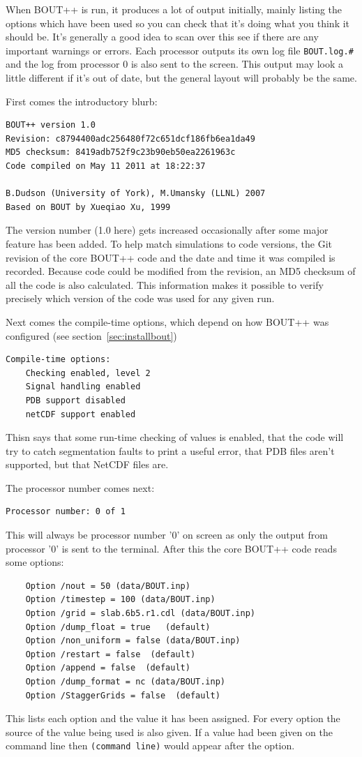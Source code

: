 \documentclass[12pt]{article}
\begin{document}
When BOUT++ is run, it produces a lot of output initially, mainly listing
the options which have been used so you can check that it's doing what you
think it should be. It's generally a good idea to scan over this
see if there are any important warnings or errors. Each processor outputs
its own log file \texttt{BOUT.log.\#}
and the log from processor 0 is also sent to the screen. This output may
look a little different if it's out of date, but the general layout will
probably be the same.

First comes the introductory blurb:
\begin{verbatim}
BOUT++ version 1.0
Revision: c8794400adc256480f72c651dcf186fb6ea1da49
MD5 checksum: 8419adb752f9c23b90eb50ea2261963c
Code compiled on May 11 2011 at 18:22:37

B.Dudson (University of York), M.Umansky (LLNL) 2007
Based on BOUT by Xueqiao Xu, 1999
\end{verbatim}
The version number (1.0 here) gets increased occasionally after
some major feature has been added. To help match simulations to code versions,
the Git revision of the core BOUT++ code and the date and time it was
compiled is recorded. Because code could be modified from the revision,
an MD5 checksum of all the code is also calculated. This information
makes it possible to verify precisely which version of the code was used
for any given run.

Next comes the compile-time options, which depend on how
BOUT++ was configured (see section~\ref{sec:installbout})
\begin{verbatim}
Compile-time options:
	Checking enabled, level 2
	Signal handling enabled
	PDB support disabled
	netCDF support enabled
\end{verbatim}
Thisn says that some run-time checking of values is enabled,
that the code will try to catch segmentation faults to print a useful
error, that PDB files aren't supported, but that NetCDF files are.

The processor number comes next:
\begin{verbatim}
Processor number: 0 of 1
\end{verbatim}
This will always be processor number '0' on screen as only the output
from processor '0' is sent to the terminal. After this
the core BOUT++ code reads some options:
\begin{verbatim}
	Option /nout = 50 (data/BOUT.inp)
	Option /timestep = 100 (data/BOUT.inp)
	Option /grid = slab.6b5.r1.cdl (data/BOUT.inp)
	Option /dump_float = true   (default)
	Option /non_uniform = false (data/BOUT.inp)
	Option /restart = false  (default)
	Option /append = false  (default)
	Option /dump_format = nc (data/BOUT.inp)
	Option /StaggerGrids = false  (default)
\end{verbatim}
This lists each option and the value it has been assigned.
For every option the source of the value being used is also given.
If a value had been given on the command line then \texttt{(command line)}
would appear after the option.
\end{document}
